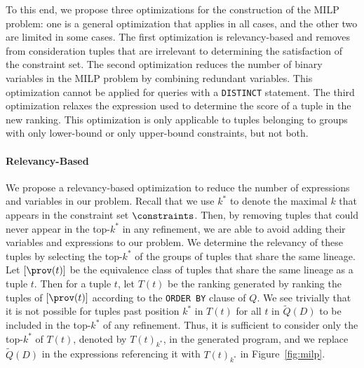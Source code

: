 
To this end, we propose three optimizations for the construction of the MILP problem: one is a general optimization that applies in all cases, and the other two are limited in some cases. The first optimization is relevancy-based and removes from consideration tuples that are irrelevant to determining the satisfaction of the constraint set. The second optimization reduces the number of binary variables in the MILP problem by combining redundant variables. This optimization cannot be applied for queries with a {\tt DISTINCT} statement. %
The third optimization relaxes the expression used to determine the score of a tuple in the new ranking. This optimization is only applicable to tuples belonging to groups with only lower-bound or only upper-bound constraints, but not both.


\paragraph*{Relevancy-Based}
We propose a relevancy-based optimization to reduce the number of expressions and variables in our problem.
Recall that we use $k^*$ to denote the maximal $k$ that appears in the constraint set $\constraints$. Then, by removing tuples that could never appear in the top-$k^*$ in any refinement, we are able to avoid adding their variables and expressions to our problem. We determine the relevancy of these tuples by selecting the top-$k^*$ of the groups of tuples that share the same lineage. Let $[\prov(t)]$ be the equivalence class of tuples that share the same lineage as a tuple $t$. Then for a tuple $t$, let $T(t)$ be the ranking generated by ranking the tuples of $[\prov(t)]$ according to the {\tt ORDER BY} clause of $Q$. We see trivially that it is not possible for tuples past position $k^*$ in $T(t)$ for all $t$ in $\widetilde{Q}(D)$ to be included in the top-$k^*$ of any refinement. Thus, it is sufficient to consider only the top-$k^*$ of $T(t)$, denoted by $T(t)_{k^*}$, in the generated program, and we replace $\widetilde{Q}(D)$ in the expressions referencing it with $T(t)_{k^*}$ in Figure~\ref{fig:milp}. 


